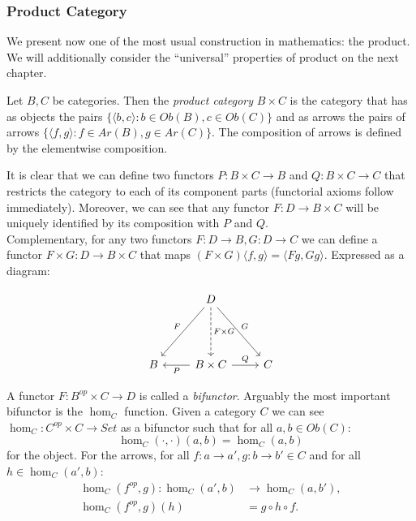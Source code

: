 \subsubsection{Product Category}
We present now one of the most usual construction in mathematics: the product. We will additionally consider the ``universal'' properties of product on the next chapter. 

\begin{definition}
  Let $B,C$ be categories. Then the \emph{product category} $B\times C$ is the category that has as objects the pairs $\{\langle b,c\rangle : b \in Ob(B), c\in Ob(C)\}$ and as arrows the pairs of arrows $\{\langle f,g\rangle: f \in Ar(B), g\in Ar(C)\}$. The composition of arrows is defined by the elementwise composition. 
\end{definition}

It is clear that we can define two functors $P: B\times C \to B$ and $Q: B \times C \to C$ that restricts the category to each of its component parts (functorial axioms follow immediately). Moreover, we can see that any functor $F:D\to B\times C$ will be uniquely identified by its composition with $P$ and $Q$.\\

Complementary, for any two functors $F:D\to B, G:D\to C$ we can define a functor $F \times G : D \to B\times C$ that maps $(F\times G) \langle f,g\rangle = \langle Fg, Gg\rangle$. Expressed as a diagram: 

\[
  \begin{tikzcd}
    {} & D
    \arrow[swap, "F"]{ddl}
    \arrow[dashed, "F\times G"]{dd}
    \arrow["G"]{ddr}\\
    {} & \\
    B & B \times C
    \arrow["P"]{l}
    \arrow["Q"]{r} & C
  \end{tikzcd}
\]

A functor $F: B^{op}\times C \to D$ is called  a \emph{bifunctor}. Arguably the most important bifunctor is the $\hom_C$ function. Given a category $C$ we can see $\hom_C: C^{op}\times C \to Set$ as a bifunctor such that for all $a,b \in Ob(C)$:
\[
  \hom_C(\cdot,\cdot)(a,b) = \hom_C (a,b) 
\]
for the object. For the arrows, for all $f:a\to a', g:b\to b' \in C$ and for all $h\in \hom_C(a',b)$:
\begin{align*}
  \hom_C(f^{op},g): \hom_C (a',b)  & \to \hom_C(a,b'), \\
  \hom_C(f^{op},g) (h)   &= g \circ h \circ f.
\end{align*}

